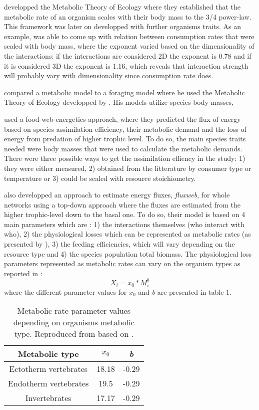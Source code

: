 \documentclass[english,12pt]{article}
\begin{document}
\cite{Brown2004MetThe} developped the Metabolic Theory of Ecology where they established that the metabolic rate of an organism scales with their body mass to the 3/4 power-law. This framework was later on developped with further organisms traits. As an example, \cite{Pawar2012DimCon} was able to come up with relation between consumption rates that were scaled with body mass, where the exponent varied based on the dimensionality of the interactions: if the interactions are considered 2D the exponent is 0.78 and if it is considered 3D the exponent is 1.16, which reveals that interaction strength will probably vary with dimensionality since consumption rate does. 

\cite{Brose2008ForThe} compared a metabolic model to a foraging model where he used the Metabolic Theory of Ecology developped by \cite{Brown2004MetThe}. His models utilize species body masses, 

\cite{Barnes2018EneFlu} used a food-web energetics approach, where they predicted the flux of energy based on species assimilation efficiency, their metabolic demand and the loss of energy from predation of higher trophic level. To do so, the main species traits needed were body masses that were used to calculate the metabolic demands. There were three possible ways to get the assimilation effiency in the study: 1) they were either measured, 2) obtained from the litterature by consumer type or temperature or 3) could be scaled with resource stoichiometry.

\cite{Gauzens2019FluRP} also developped an approach to estimate energy fluxes, \emph{fluxweb}, for whole networks using a top-down approach where the fluxes are estimated from the higher trophic-level down to the basal one. To do so, their model is based on 4 main parameters which are : 1) the interactions themselves (who interact with who), 2) the physiological losses which can be represented as metabolic rates (as presented by \cite{Brown2004MetThe}), 3) the feeding efficiencies, which will vary depending on the resource type and 4) the species population total biomass. The physiological loss parameters represented as metabolic rates can vary on the organism types as reported in \cite{Brown2004MetThe}:\
\begin{equation*}
  X_{i} = x_{0}*M_{i}^{b}
\end{equation*}
where the different parameter values for $x_{0}$ and \emph{b} are presented in table 1.
\

\begin{table}[h!]
\centering
\begin{tabular}{ |c|c|c| }
 \hline
 Metabolic type & $x_{0}$ & \emph{b} \\ 
 \hline
 Ectotherm vertebrates & 18.18 & -0.29 \\ 
 Endotherm vertebrates & 19.5 & -0.29 \\
 Invertebrates & 17.17 & -0.29 \\
 \hline
\end{tabular}
\caption{Metabolic rate parameter values depending on organisms metabolic type. Reproduced from \cite{Gauzens2019FluRP} based on \cite{Brown2004MetThe}.}
\label{tab_meta}
\end{table}\
\end{document}
